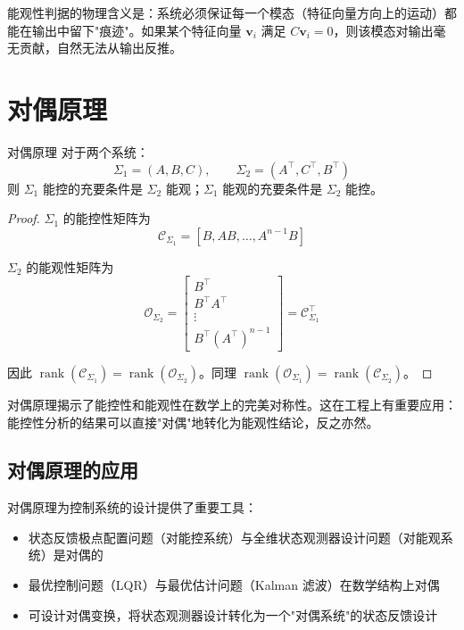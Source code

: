 \begin{remark}
能观性判据的物理含义是：系统必须保证每一个模态（特征向量方向上的运动）都能在输出中留下"痕迹"。如果某个特征向量 $\mathbf{v}_i$ 满足 $C\mathbf{v}_i = 0$，则该模态对输出毫无贡献，自然无法从输出反推。
\end{remark}

\section{对偶原理}

\begin{myTheorem}{对偶原理}
对于两个系统：
\[
\Sigma_1 = (A, B, C),\qquad
\Sigma_2 = (A^{\top}, C^{\top}, B^{\top})
\]
则 $\Sigma_1$ 能控的充要条件是 $\Sigma_2$ 能观；$\Sigma_1$ 能观的充要条件是 $\Sigma_2$ 能控。
\end{myTheorem}

\begin{proof}
$\Sigma_1$ 的能控性矩阵为
\[
\mathcal{C}_{\Sigma_1} = [B, AB, \ldots, A^{n-1}B]
\]

$\Sigma_2$ 的能观性矩阵为
\[
\mathcal{O}_{\Sigma_2} = \begin{bmatrix}
B^{\top} \\ B^{\top} A^{\top} \\ \vdots \\ B^{\top} (A^{\top})^{n-1}
\end{bmatrix} = \mathcal{C}_{\Sigma_1}^{\top}
\]

因此 $\operatorname{rank}(\mathcal{C}_{\Sigma_1}) = \operatorname{rank}(\mathcal{O}_{\Sigma_2})$。同理 $\operatorname{rank}(\mathcal{O}_{\Sigma_1}) = \operatorname{rank}(\mathcal{C}_{\Sigma_2})$。
\end{proof}

\begin{remark}
对偶原理揭示了能控性和能观性在数学上的完美对称性。这在工程上有重要应用：能控性分析的结果可以直接"对偶"地转化为能观性结论，反之亦然。
\end{remark}

\subsection{对偶原理的应用}

对偶原理为控制系统的设计提供了重要工具：
\begin{itemize}
    \item 状态反馈极点配置问题（对能控系统）与全维状态观测器设计问题（对能观系统）是对偶的
    \item 最优控制问题（LQR）与最优估计问题（Kalman 滤波）在数学结构上对偶
    \item 可设计对偶变换，将状态观测器设计转化为一个"对偶系统"的状态反馈设计
\end{itemize}

